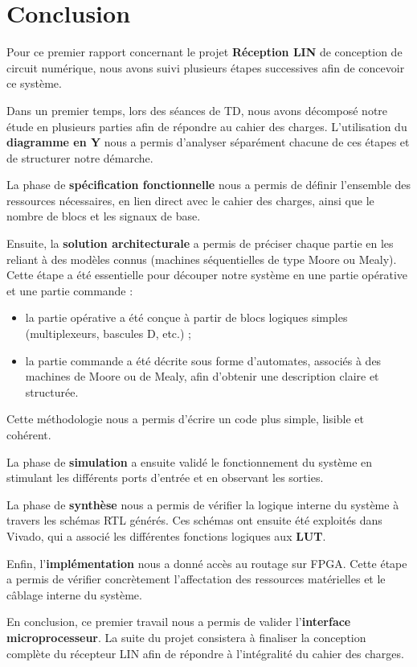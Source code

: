 \section{Conclusion}

Pour ce premier rapport concernant le projet \textbf{Réception LIN} de conception de circuit numérique, 
nous avons suivi plusieurs étapes successives afin de concevoir ce système.  

Dans un premier temps, lors des séances de TD, nous avons décomposé notre étude en plusieurs parties afin de répondre au cahier des charges. 
L’utilisation du \textbf{diagramme en Y} nous a permis d’analyser séparément chacune de ces étapes et de structurer notre démarche. 
\newline

La phase de \textbf{spécification fonctionnelle} nous a permis de définir l’ensemble des ressources nécessaires, 
en lien direct avec le cahier des charges, ainsi que le nombre de blocs et les signaux de base.  
\newline

Ensuite, la \textbf{solution architecturale} a permis de préciser chaque partie en les reliant à des modèles connus 
(machines séquentielles de type Moore ou Mealy). 
Cette étape a été essentielle pour découper notre système en une partie opérative et une partie commande :  
\newline

\begin{itemize}
    \item la partie opérative a été conçue à partir de blocs logiques simples (multiplexeurs, bascules D, etc.) ;  
    \item la partie commande a été décrite sous forme d’automates, associés à des machines de Moore ou de Mealy, 
    afin d’obtenir une description claire et structurée.  
\end{itemize}
Cette méthodologie nous a permis d’écrire un code plus simple, lisible et cohérent.  

La phase de \textbf{simulation} a ensuite validé le fonctionnement du système en stimulant les différents ports d’entrée 
et en observant les sorties.  
\newline

La phase de \textbf{synthèse} nous a permis de vérifier la logique interne du système à travers les schémas RTL générés. 
Ces schémas ont ensuite été exploités dans Vivado, qui a associé les différentes fonctions logiques aux \textbf{LUT}.  
\newline

Enfin, l’\textbf{implémentation} nous a donné accès au routage sur FPGA. 
Cette étape a permis de vérifier concrètement l’affectation des ressources matérielles et le câblage interne du système.  
\newline

En conclusion, ce premier travail nous a permis de valider l’\textbf{interface microprocesseur}. 
La suite du projet consistera à finaliser la conception complète du récepteur LIN afin de répondre à l’intégralité du cahier des charges.
